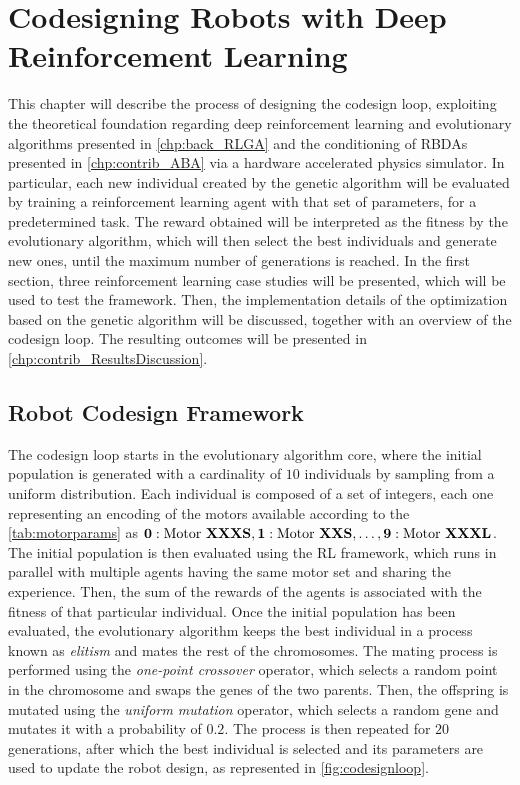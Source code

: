\chapter{Codesigning Robots with Deep Reinforcement Learning}
\label{chp:contrib_CodesignRL}

This chapter will describe the process of designing the codesign loop, exploiting the theoretical foundation regarding deep reinforcement learning and evolutionary algorithms presented in \cref{chp:back_RLGA} and the conditioning of \ac{RBDA}s presented in \cref{chp:contrib_ABA} via a hardware accelerated physics simulator. In particular, each new individual created by the genetic algorithm will be evaluated by training a reinforcement learning agent with that set of parameters, for a predetermined task. The reward obtained will be interpreted as the fitness by the evolutionary algorithm, which will then select the best individuals and generate new ones, until the maximum number of generations is reached. In the first section, three reinforcement learning case studies will be presented, which will be used to test the framework. Then, the implementation details of the optimization based on the genetic algorithm will be discussed, together with an overview of the codesign loop. The resulting outcomes will be presented in \cref{chp:contrib_ResultsDiscussion}.


\section{Robot Codesign Framework}
\label{sec:Codesign}

The codesign loop starts in the evolutionary algorithm core, where the initial population is generated with a cardinality of $10$ individuals by sampling from a uniform distribution. Each individual is composed of a set of integers, each one representing an encoding of the motors available according to the \cref{tab:motorparams} as $\mathbf{0}: \text{Motor \textbf{XXXS}}, \mathbf{1}:\text{Motor \textbf{XXS}}, \dots, \mathbf{9}:\text{Motor \textbf{XXXL}}$. The initial population is then evaluated using the \ac{RL} framework, which runs in parallel with multiple agents having the same motor set and sharing the experience. Then, the sum of the rewards of the agents is associated with the fitness of that particular individual. Once the initial population has been evaluated, the evolutionary algorithm keeps the best individual in a process known as \textit{elitism} and mates the rest of the chromosomes. The mating process is performed using the \textit{one-point crossover} operator, which selects a random point in the chromosome and swaps the genes of the two parents. Then, the offspring is mutated using the \textit{uniform mutation} operator, which selects a random gene and mutates it with a probability of $0.2$. The process is then repeated for $20$ generations, after which the best individual is selected and its parameters are used to update the robot design, as represented in \cref{fig:codesignloop}.

